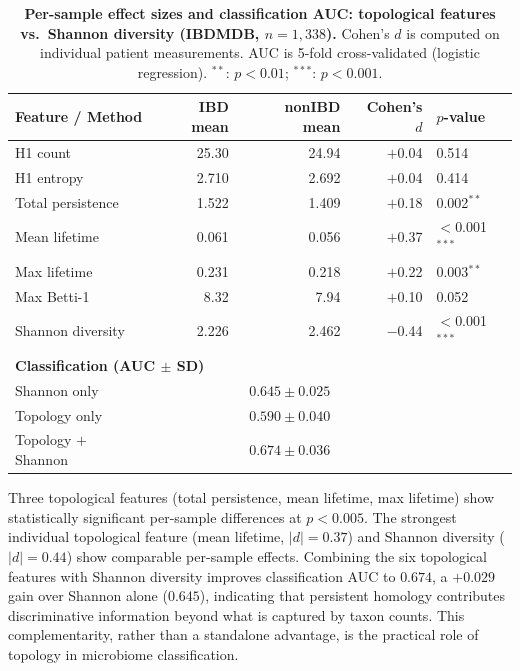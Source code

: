 \begin{table}[H]
\centering
\caption{%
  \textbf{Per-sample effect sizes and classification AUC:
  topological features vs.\ Shannon diversity (IBDMDB, $n = 1{,}338$).}
  Cohen's $d$ is computed on individual patient measurements.
  AUC is 5-fold cross-validated (logistic regression).
  $^{**}$: $p < 0.01$; $^{***}$: $p < 0.001$.
}
\label{tab:persample_validation}
\small
\setlength{\tabcolsep}{5pt}
\begin{tabular}{lrrrl}
\toprule
\textbf{Feature / Method} & \textbf{IBD mean} & \textbf{nonIBD mean}
  & \textbf{Cohen's $d$} & \textbf{$p$-value} \\
\midrule
H1 count            & 25.30  & 24.94  & $+$0.04  & 0.514 \\
H1 entropy          & 2.710  & 2.692  & $+$0.04  & 0.414 \\
Total persistence   & 1.522  & 1.409  & $+$0.18  & 0.002$^{**}$ \\
Mean lifetime       & 0.061  & 0.056  & $+$0.37  & $<$0.001$^{***}$ \\
Max lifetime        & 0.231  & 0.218  & $+$0.22  & 0.003$^{**}$ \\
Max Betti-1         & 8.32   & 7.94   & $+$0.10  & 0.052 \\
\addlinespace
Shannon diversity   & 2.226  & 2.462  & $-$0.44  & $<$0.001$^{***}$ \\
\midrule
\multicolumn{4}{l}{\textbf{Classification (AUC $\pm$ SD)}} \\
\midrule
Shannon only        & \multicolumn{3}{c}{$0.645 \pm 0.025$} \\
Topology only       & \multicolumn{3}{c}{$0.590 \pm 0.040$} \\
Topology $+$ Shannon & \multicolumn{3}{c}{$\mathbf{0.674 \pm 0.036}$} \\
\bottomrule
\end{tabular}
\end{table}

Three topological features (total persistence, mean lifetime, max lifetime)
show statistically significant per-sample differences at $p < 0.005$.
The strongest individual topological feature (mean lifetime,
$|d| = 0.37$) and Shannon diversity ($|d| = 0.44$) show comparable
per-sample effects.
Combining the six topological features with Shannon diversity improves
classification AUC to $0.674$, a $+0.029$ gain over Shannon alone ($0.645$),
indicating that persistent homology contributes discriminative information
beyond what is captured by taxon counts.
This complementarity, rather than a standalone advantage, is the
practical role of topology in microbiome classification.

